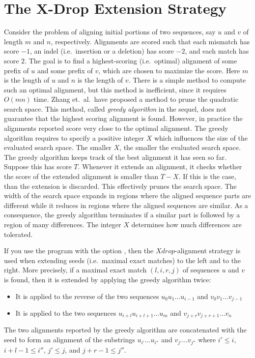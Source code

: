 \documentclass[12pt,titlepage]{article}
\newcommand{\Xdrop}[0]{\mathit{Xdrop}}
\begin{document}
\section{The X-Drop Extension Strategy}\label{Xdropextend}
Consider the problem of aligning initial portions of two sequences,
say \(u\) and \(v\) of length \(m\) and \(n\), respectively. Alignments 
are scored such that each mismatch has score 
\(-1\), an indel (i.e.\ insertion or a deletion) has score \(-2\), and each 
match has score \(2\).  The goal is to find a highest-scoring (i.e.\ optimal)
alignment of some prefix of \(u\) and some prefix of \(v\),
which are chosen to maximize the score. Here \(m\) is the length of \(u\) and 
\(n\) is the length of \(v\). There is a simple method to compute
such an optimal alignment, but this method is inefficient,
since it requires \(O(mn)\) time. 
Zhang et.\ al.\ have proposed a method to
prune the quadratic search space. This method, called 
\emph{greedy algorithm}
in the sequel, does not guarantee that the highest scoring alignment is 
found. However, in practice the alignments reported score very close to the 
optimal alignment. The greedy algorithm requires to specify a positive
integer \(X\) which influences the size of the evaluated search space. 
The smaller \(X\), the smaller the evaluated search space. The greedy
algorithm keeps track of the best alignment it has seen so far. Suppose this
has score \(T\). Whenever it extends an alignment, it checks whether the 
score of the extended alignment is smaller than \(T-X\).
If this is the case, than the extension is discarded.
This effectively prunes the search space. The width of the search space
expands in regions where the aligned sequence parts are different
while it reduces in regions where the aligned sequences are similar. As
a consequence, the greedy algorithm terminates if a similar part is 
followed by a region of many differences. The integer \(X\) determines how
much differences are tolerated.

If you use the program \VM with the option , then the
$\Xdrop$-alignment strategy is used when extending seeds 
(i.e.\ maximal exact matches) to the left and to the right. More 
precisely, if a maximal exact match \((l,i,r,j)\) of sequences \(u\) and 
\(v\) is found, then it is extended by applying the greedy algorithm twice:
\begin{itemize}
\item
It is applied to the reverse of the two sequences 
\(u_{0}u_{1}\ldots u_{i-1}\) and
\(v_{0}v_{1}\ldots v_{j-1}\)
\item
It is applied to the two sequences \(u_{i+l}u_{i+l+1}\ldots u_{m}\) and
\(v_{j+r}v_{j+r+1}\ldots v_{n}\)
\end{itemize}
The two alignments reported by the greedy algorithm are concatenated 
with the seed to form an alignment of the substrings 
\(u_{i'}\ldots u_{i''}\) and
\(v_{j'}\ldots v_{j''}\) where 
\(i'\leq i\), \(i+l-1\leq i''\),
\(j'\leq j\), and \(j+r-1\leq j''\).
\end{document}
